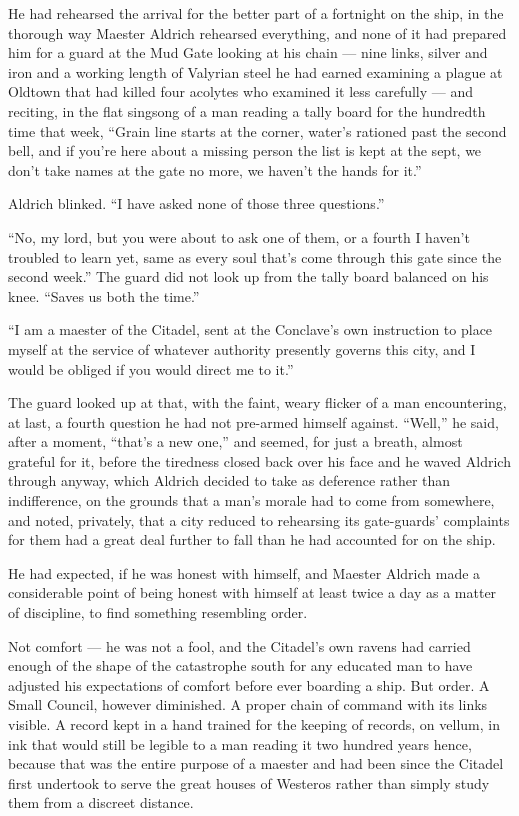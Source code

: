 He had rehearsed the arrival for the better part of a fortnight on the ship, in the thorough way Maester Aldrich rehearsed everything, and none of it had prepared him for a guard at the Mud Gate looking at his chain — nine links, silver and iron and a working length of Valyrian steel he had earned examining a plague at Oldtown that had killed four acolytes who examined it less carefully — and reciting, in the flat singsong of a man reading a tally board for the hundredth time that week, “Grain line starts at the corner, water’s rationed past the second bell, and if you’re here about a missing person the list is kept at the sept, we don’t take names at the gate no more, we haven’t the hands for it.”

Aldrich blinked. “I have asked none of those three questions.”

“No, my lord, but you were about to ask one of them, or a fourth I haven’t troubled to learn yet, same as every soul that’s come through this gate since the second week.” The guard did not look up from the tally board balanced on his knee. “Saves us both the time.”

“I am a maester of the Citadel, sent at the Conclave’s own instruction to place myself at the service of whatever authority presently governs this city, and I would be obliged if you would direct me to it.”

The guard looked up at that, with the faint, weary flicker of a man encountering, at last, a fourth question he had not pre-armed himself against. “Well,” he said, after a moment, “that’s a new one,” and seemed, for just a breath, almost grateful for it, before the tiredness closed back over his face and he waved Aldrich through anyway, which Aldrich decided to take as deference rather than indifference, on the grounds that a man’s morale had to come from somewhere, and noted, privately, that a city reduced to rehearsing its gate-guards' complaints for them had a great deal further to fall than he had accounted for on the ship.

\sceneBreak

He had expected, if he was honest with himself, and Maester Aldrich made a considerable point of being honest with himself at least twice a day as a matter of discipline, to find something resembling order.

Not comfort — he was not a fool, and the Citadel’s own ravens had carried enough of the shape of the catastrophe south for any educated man to have adjusted his expectations of comfort before ever boarding a ship. But order. A Small Council, however diminished. A proper chain of command with its links visible. A record kept in a hand trained for the keeping of records, on vellum, in ink that would still be legible to a man reading it two hundred years hence, because that was the entire purpose of a maester and had been since the Citadel first undertook to serve the great houses of Westeros rather than simply study them from a discreet distance.

